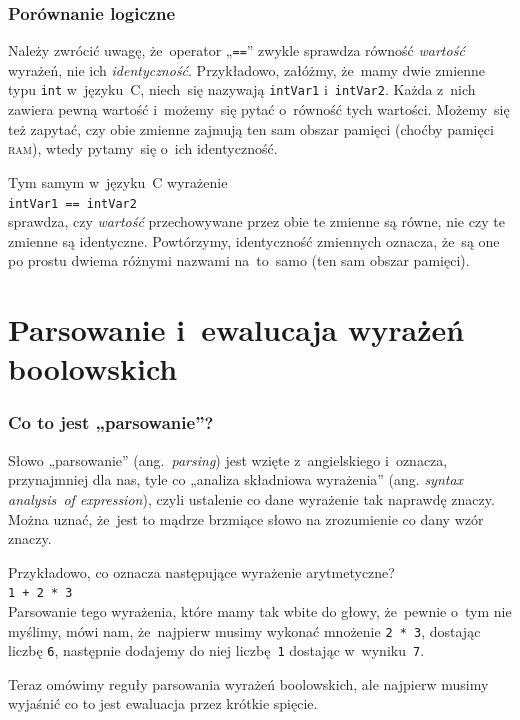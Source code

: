 \documentclass[10pt,t]{beamer}
\begin{document}
\begin{frame}
  \frametitle{Porównanie logiczne}


  Należy zwrócić uwagę, że~operator „\texttt{==}” zwykle sprawdza równość
  \textit{wartość} wyrażeń, nie ich \textit{identyczność}. Przykładowo,
  załóżmy, że~mamy dwie zmienne typu \texttt{int} w~języku~C, niech~się
  nazywają \texttt{intVar1} i~\texttt{intVar2}. Każda z~nich zawiera pewną
  wartość i~możemy~się pytać o~równość tych wartości. Możemy~się też
  zapytać, czy obie zmienne zajmują ten sam obszar pamięci (choćby pamięci
  \textsc{ram}), wtedy pytamy~się o~ich identyczność.

  Tym samym w~języku~C wyrażenie \\
  \texttt{intVar1 == intVar2} \\
  sprawdza, czy \textit{wartość} przechowywane przez obie te
  zmienne są równe, nie czy te zmienne są identyczne. Powtórzymy,
  identyczność zmiennych oznacza, że~są one po prostu dwiema różnymi
  nazwami na~to~samo (ten sam obszar pamięci).

\end{frame}










\section{Parsowanie i~ewalucaja wyrażeń boolowskich}



\begin{frame}
  \frametitle{Co to jest „parsowanie”?}


  Słowo „parsowanie” (ang.~\textit{parsing}) jest wzięte z~angielskiego
  i~oznacza, przynajmniej dla nas, tyle co „analiza składniowa wyrażenia”
  (ang. \textit{syntax analysis~of expression}), czyli ustalenie co dane
  wyrażenie tak naprawdę znaczy. Można uznać, że~jest to mądrze brzmiące
  słowo na zrozumienie co dany wzór znaczy.

  Przykładowo, co oznacza następujące wyrażenie arytmetyczne? \\
  \texttt{1 + 2 * 3} \\
  Parsowanie tego wyrażenia, które mamy tak wbite do głowy, że~pewnie o~tym
  nie myślimy, mówi nam, że~najpierw musimy wykonać mnożenie
  \texttt{2 * 3}, dostając liczbę \texttt{6}, następnie dodajemy do
  niej liczbę~\texttt{1} dostając w~wyniku~\texttt{7}.

  Teraz omówimy reguły parsowania wyrażeń boolowskich, ale najpierw musimy
  wyjaśnić co to jest ewaluacja przez krótkie spięcie.

\end{frame}
\end{document}

